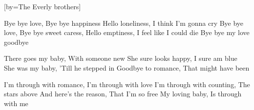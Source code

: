  

[by=The Everly brothers]


\beginchorus
    Bye bye love, \brk  Bye bye happiness
    Hello loneliness, \brk  I think I'm gonna cry
    Bye bye love, \brk  Bye bye sweet caress, 
    Hello emptiness, \brk  I feel like I could die
    Bye bye my love goodbye
\endchorus

\beginverse
There goes my baby, \brk  With someone new
She sure looks happy, \brk  I sure am blue
She was my baby, \brk  'Till he stepped in
Goodbye to romance, \brk  That might have been
\endverse

\beginverse
I'm through with romance, \brk  I'm through with love
I'm through with counting, \brk  The stars above
And here's the reason, \brk  That I'm so free
My loving baby, \brk  Is through with me
\endverse




\endsong
